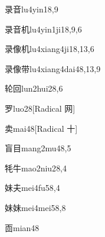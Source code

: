 \begin{verbete}{录音}{lu4yin1}{8,9}
\end{verbete}

\begin{verbete}{录音机}{lu4yin1ji1}{8,9,6}
\end{verbete}

\begin{verbete}{录像机}{lu4xiang4ji1}{8,13,6}
\end{verbete}

\begin{verbete}{录像带}{lu4xiang4dai4}{8,13,9}
\end{verbete}

\begin{verbete}{轮回}{lun2hui2}{8,6}
\end{verbete}

\begin{verbete}{罗}{luo2}{8}[Radical 网]
\end{verbete}

\begin{verbete}{卖}{mai4}{8}[Radical 十]
\end{verbete}

\begin{verbete}{盲目}{mang2mu4}{8,5}
\end{verbete}

\begin{verbete}{牦牛}{mao2niu2}{8,4}
\end{verbete}

\begin{verbete}{妹夫}{mei4fu5}{8,4}
\end{verbete}

\begin{verbete}{妹妹}{mei4mei5}{8,8}
\end{verbete}

\begin{verbete}{靣}{mian4}{8}
\end{verbete}


